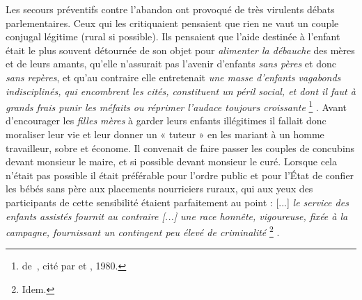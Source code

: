  Les secours préventifs contre l'abandon ont provoqué de très virulents débats parlementaires. Ceux qui les critiquaient pensaient que rien ne vaut un couple conjugal légitime (rural si possible). Ils pensaient que l'aide destinée à l'enfant était le plus souvent détournée de son objet pour \emph{ alimenter la débauche} des mères et de leurs amants, qu'elle n'assurait pas l'avenir d'enfants \emph{sans pères} et donc \emph{sans repères}, et qu'au contraire elle entretenait \emph{une masse d'enfants vagabonds indisciplinés, qui encombrent les cités, constituent un péril social, et dont il faut à grands frais punir les méfaits ou réprimer l'audace toujours croissante}%
\footnote{de~, cité par  et , 1980.}%
. Avant d'encourager les \emph{filles mères} à garder leurs enfants illégitimes il fallait donc moraliser leur vie et leur donner un « tuteur » en les mariant à un homme travailleur, sobre et économe. Il convenait de faire passer les couples de concubins devant monsieur le maire, et si possible devant monsieur le curé. Lorsque cela n'était pas possible il était préférable pour l'ordre public et pour l'État de confier les bébés sans père aux placements nourriciers ruraux, qui aux yeux des participants de cette sensibilité étaient parfaitement au point : [...] \emph{le service des enfants assistés fournit au contraire \emph{[...]} une race honnête, vigoureuse, fixée à la campagne, fournissant un contingent peu élevé de criminalité}%
\footnote{Idem.}%
.

